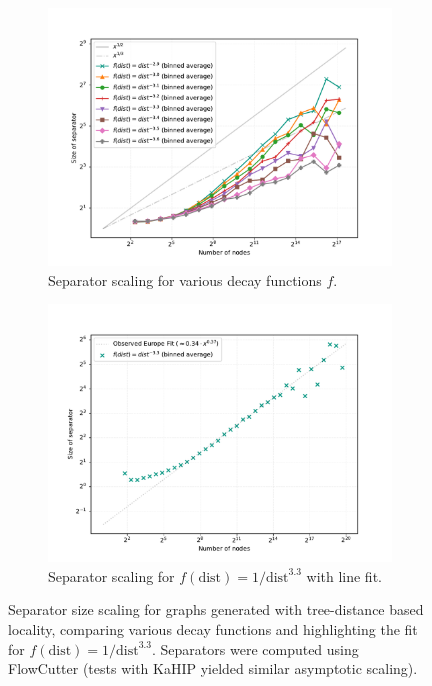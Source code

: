 \begin{figure}[tbhp]
	\centering
	\begin{subfigure}{0.45\linewidth}
		\centering
		\includegraphics[width=\linewidth]{graphics/tree_local_pow_overview.pdf}
		\caption{Separator scaling for various decay functions \(f\).}
		\label{fig:tree_dist_compare_functions}
	\end{subfigure}
	\hfill
	\begin{subfigure}{0.45\linewidth}
		\centering
		\includegraphics[width=\linewidth]{graphics/tree_locality_33_1000000.pdf}
		\caption{Separator scaling for \(f(\text{dist}) = 1/\text{dist}^{3.3}\) with line fit.}
		\label{fig:tree_dist_best_fit_scaling}
	\end{subfigure}
	\caption{Separator size scaling for graphs generated with tree-distance based locality, comparing various decay functions and highlighting the fit for \(f(\text{dist}) = 1/\text{dist}^{3.3}\). Separators were computed using FlowCutter (tests with KaHIP yielded similar asymptotic scaling).}
	\label{fig:tree_dist_locality_scaling}
\end{figure}


